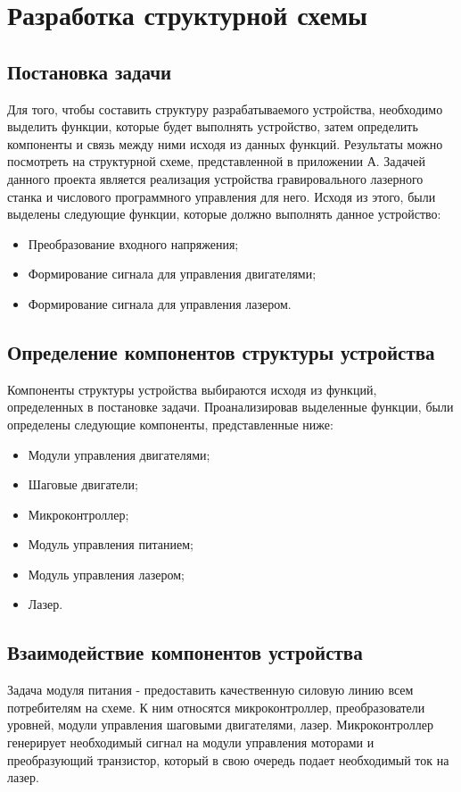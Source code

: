 \section{Разработка структурной схемы}
\label{sec:struct}

\subsection{Постановка задачи}
Для того, чтобы составить структуру разрабатываемого устройства, необходимо выделить функции, 
которые будет выполнять устройство, затем определить компоненты и связь между ними исходя из данных функций. 
Результаты можно посмотреть на структурной схеме, представленной в приложении А. 
Задачей данного проекта является реализация устройства гравировального лазерного станка и числового программного управления для него. 
Исходя из этого, были выделены следующие функции, которые должно выполнять данное устройство: 
\begin{itemize}
    \item Преобразование входного напряжения;
    \item Формирование сигнала для управления двигателями;
    \item Формирование сигнала для управления лазером.
\end{itemize}

\subsection{Определение компонентов структуры устройства}
Компоненты структуры устройства выбираются исходя из функций, определенных в постановке задачи. Проанализировав выделенные функции, были определены следующие компоненты, представленные ниже:
\begin{itemize}
    \item Модули управления двигателями;
    \item Шаговые двигатели;
    \item Микроконтроллер;
    \item Модуль управления питанием;
    \item Модуль управления лазером;
    \item Лазер.
\end{itemize}

\subsection{Взаимодействие компонентов устройства}
Задача модуля питания - предоставить качественную силовую линию\cite{schemt_1} всем потребителям на схеме. 
К ним относятся микроконтроллер, преобразователи уровней, модули управления шаговыми двигателями, лазер. 
Микроконтроллер генерирует необходимый сигнал на модули управления моторами и преобразующий транзистор, 
который в свою очередь подает необходимый ток на лазер. 